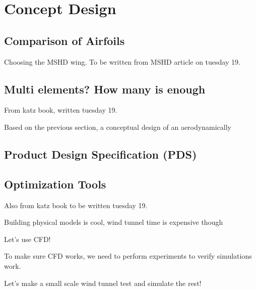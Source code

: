 \chapter{Concept Design}

  \section{Comparison of Airfoils}
    Choosing the MSHD wing.
    To be written from MSHD article on tuesday 19.

  \section{Multi elements? How many is enough}
    From katz book, written tuesday 19.

    Based on the previous section, a conceptual design of an aerodynamically

  \section{Product Design Specification (PDS)}


  \section{Optimization Tools}

    Also from katz book to be written tuesday 19.

    Building physical models is cool, wind tunnel time is expensive though

    Let's use CFD!

    To make sure CFD works, we need to perform experiments to verify simulations work.

    Let's make a small scale wind tunnel test and simulate the rest!
